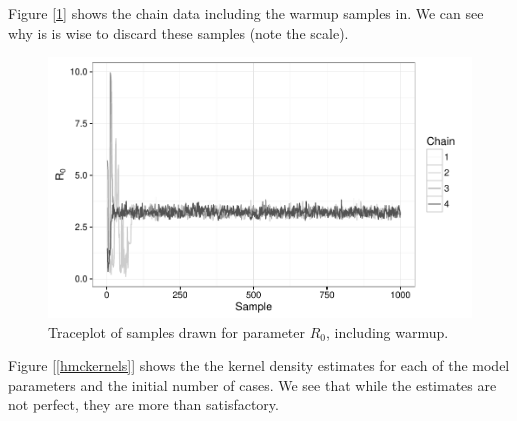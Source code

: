 	Figure [\ref{traceplot2}] shows the chain data including the warmup samples in. We can see why is is wise to discard these samples (note the scale).

    \begin{figure}
        \centering
        \captionsetup{width=0.8\linewidth}
        \includegraphics[width=\textwidth]{./images/traceplotR0_inc.pdf}
        \caption{Traceplot of samples drawn for parameter $R_0$, including warmup. \label{traceplot2}}
    \end{figure}

    Figure [\ref{hmckernels}] shows the the kernel density estimates for each of the model parameters and the initial number of cases. We see that while the estimates are not perfect, they are more than satisfactory.

